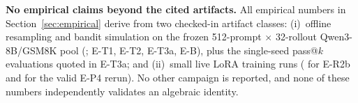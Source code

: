 \documentclass[11pt]{article}
\theoremstyle{plain}
\theoremstyle{definition}
\theoremstyle{remark}
\newcommand{\1}{\mathbb{1}}
\begin{document}
\begin{sloppypar}\noindent\textbf{No empirical claims beyond the cited artifacts.} All empirical
numbers in Section~\ref{sec:empirical} derive from two checked-in artifact
classes: (i)~offline resampling and bandit simulation on the frozen
512-prompt $\times$ 32-rollout Qwen3-8B/GSM8K pool
(;
E-T1, E-T2, E-T3a, E-B), plus the single-seed pass@$k$ evaluations quoted in
E-T3a; and (ii)~small live LoRA training runs
( for E-R2b and
 for the valid E-P4 rerun).
No other campaign is reported, and none of these numbers independently
validates an algebraic identity.\end{sloppypar}




\end{document}
